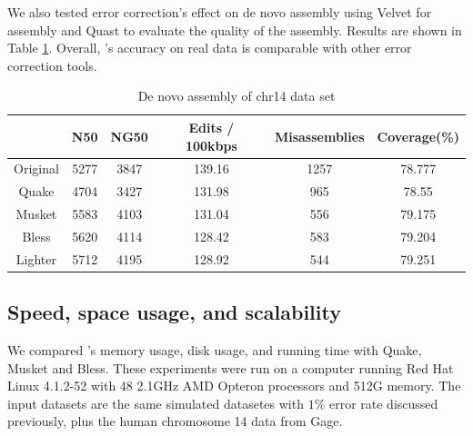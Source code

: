 \documentclass[10pt]{article}
\begin{document}
We also tested error correction's effect on de novo assembly using Velvet for assembly and Quast to evaluate the quality of the assembly.  Results are shown in Table \ref{table:chr14_assembly}. Overall, \tool's accuracy on real data is comparable with other error correction tools.

\begin{table}
\centering
\begin{tabular}{|c|c|c|c|c|c|} \hline
	   & N50 &	NG50	& Edits / 100kbps &	Misassemblies	& Coverage(\%) \\ \hline
Original &	5277	&3847	&139.16	&1257	&78.777 \\ \hline
Quake	&	4704	&3427	&131.98	&965	&78.55 \\ \hline
Musket	&	5583	&4103	&131.04	&556	&79.175 \\ \hline
Bless	&	5620	&4114	&128.42	&583	&79.204 \\ \hline
Lighter	&	5712	&4195	&128.92	&544	&79.251 \\ \hline

\end{tabular}
\caption{De novo assembly of chr14 data set\label{table:chr14_assembly}}
\end{table}

\subsection*{Speed, space usage, and scalability}
We compared \tool's memory usage, disk usage, and running time with Quake, Musket and Bless.  These experiments were run on a computer running Red Hat Linux 4.1.2-52 with 48 2.1GHz AMD Opteron processors and 512G memory.
The input datasets are the same simulated \ecoli datasetes with $1\%$ error rate discussed previously, plus the human chromosome 14 data from Gage.  %
\end{document}
